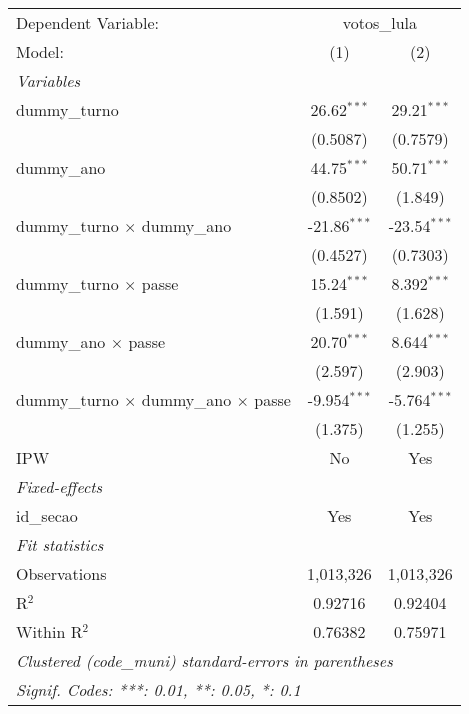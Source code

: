 \begin{tabular}{lcc}
   \tabularnewline\midrule\midrule
   Dependent Variable: & \multicolumn{2}{c}{votos\_lula}\\
   Model:                                              & (1)            & (2)\\
   \midrule \emph{Variables} &   &  \\
   dummy\_turno                                       & 26.62$^{***}$  & 29.21$^{***}$\\
                                                       & (0.5087)       & (0.7579)\\
   dummy\_ano                                         & 44.75$^{***}$  & 50.71$^{***}$\\
                                                       & (0.8502)       & (1.849)\\
   dummy\_turno $\times$ dummy\_ano                 & -21.86$^{***}$ & -23.54$^{***}$\\
                                                       & (0.4527)       & (0.7303)\\
   dummy\_turno $\times$ passe                       & 15.24$^{***}$  & 8.392$^{***}$\\
                                                       & (1.591)        & (1.628)\\
   dummy\_ano $\times$ passe                         & 20.70$^{***}$  & 8.644$^{***}$\\
                                                       & (2.597)        & (2.903)\\
   dummy\_turno $\times$ dummy\_ano $\times$ passe & -9.954$^{***}$ & -5.764$^{***}$\\
                                                       & (1.375)        & (1.255)\\
   IPW                                                 & No             & Yes\\
   \midrule \emph{Fixed-effects} &   &  \\
   id\_secao                                          & Yes            & Yes\\
   \midrule \emph{Fit statistics} &   &  \\
   Observations                                        & 1,013,326      & 1,013,326\\
   R$^2$                                               & 0.92716        & 0.92404\\
   Within R$^2$                                        & 0.76382        & 0.75971\\
   \midrule\midrule\multicolumn{3}{l}{\emph{Clustered (code\_muni) standard-errors in parentheses}}\\
   \multicolumn{3}{l}{\emph{Signif. Codes: ***: 0.01, **: 0.05, *: 0.1}}\\
\end{tabular}


